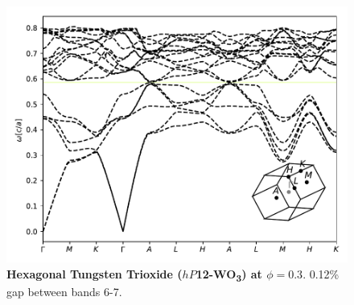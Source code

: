 \documentclass[fleqn,amsmath,amssymb,superscriptaddress, reprint,prl]{revtex4-1}
\begin{document}
\begin{figure}
\includegraphics[width=0.9\linewidth]{workspace/0aa8550ab3093c6ef2e85d83d1dc6830/images/r=14.pdf}
	\caption{\textbf{Hexagonal Tungsten Trioxide ($hP$12-WO\textsubscript{3}) at $\phi=0.3$}. 0.12\% gap between bands 6-7.}
\end{figure}
\end{document}
